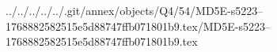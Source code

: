 ../../../../../.git/annex/objects/Q4/54/MD5E-s5223--1768882582515e5d88747ffb071801b9.tex/MD5E-s5223--1768882582515e5d88747ffb071801b9.tex